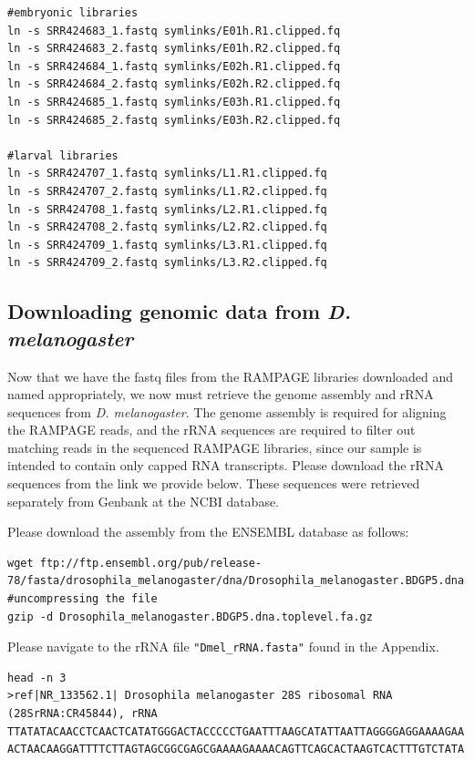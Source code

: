 \documentclass[runningheads,a4paper]{llncs}
\begin{document}
\begin{linenumbers}
\begin{verbatim}
#embryonic libraries
ln -s SRR424683_1.fastq symlinks/E01h.R1.clipped.fq 
ln -s SRR424683_2.fastq symlinks/E01h.R2.clipped.fq
ln -s SRR424684_1.fastq symlinks/E02h.R1.clipped.fq
ln -s SRR424684_2.fastq symlinks/E02h.R2.clipped.fq
ln -s SRR424685_1.fastq symlinks/E03h.R1.clipped.fq
ln -s SRR424685_2.fastq symlinks/E03h.R2.clipped.fq

#larval libraries
ln -s SRR424707_1.fastq symlinks/L1.R1.clipped.fq 
ln -s SRR424707_2.fastq symlinks/L1.R2.clipped.fq
ln -s SRR424708_1.fastq symlinks/L2.R1.clipped.fq
ln -s SRR424708_2.fastq symlinks/L2.R2.clipped.fq
ln -s SRR424709_1.fastq symlinks/L3.R1.clipped.fq
ln -s SRR424709_2.fastq symlinks/L3.R2.clipped.fq
\end{verbatim}

\subsection{Downloading genomic data from \textit{D. melanogaster}}
Now that we have the fastq files from the RAMPAGE libraries downloaded and named appropriately, we now must retrieve the genome assembly and rRNA sequences from \textit{D. melanogaster}.
The genome assembly is required for aligning the RAMPAGE reads, and the rRNA sequences are required to filter out matching reads in the sequenced RAMPAGE libraries, since our sample is intended to contain only capped RNA transcripts. 
Please download the rRNA sequences from the link we provide below. 
These sequences were retrieved separately from Genbank at the NCBI database.

Please download the assembly from the ENSEMBL database as follows:

\noindent
\begin{verbatim}
wget ftp://ftp.ensembl.org/pub/release-78/fasta/drosophila_melanogaster/dna/Drosophila_melanogaster.BDGP5.dna.toplevel.fa.gz
#uncompressing the file
gzip -d Drosophila_melanogaster.BDGP5.dna.toplevel.fa.gz
\end{verbatim}

Please navigate to the rRNA file \texttt{"Dmel\_rRNA.fasta"} found in the Appendix.

\noindent
\begin{verbatim}
head -n 3
>ref|NR_133562.1| Drosophila melanogaster 28S ribosomal RNA (28SrRNA:CR45844), rRNA
TTATATACAACCTCAACTCATATGGGACTACCCCCTGAATTTAAGCATATTAATTAGGGGAGGAAAAGAA
ACTAACAAGGATTTTCTTAGTAGCGGCGAGCGAAAAGAAAACAGTTCAGCACTAAGTCACTTTGTCTATA
\end{verbatim}


\end{linenumbers}
\end{document}
